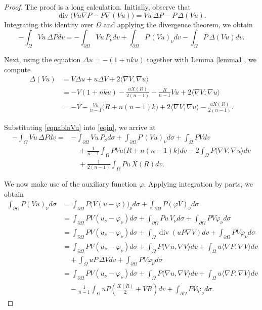 \documentclass[reqno,11pt]{amsart}
\numberwithin{equation}{section}  %
\begin{document}
\begin{proof} 
The proof is a long calculation.
Initially, observe that
\[
\operatorname{div}\bigl(Vu\nabla P-P\nabla(Vu)\bigr)
=
Vu\,\Delta P-P\,\Delta(Vu).
\]
Integrating this identity over \(\Omega\) and applying the divergence theorem, we obtain
\begin{equation}\label{eqin}
-\int_{\Omega}Vu\,\Delta Pdv
=
-\int_{\partial\Omega}Vu\,P_{\nu}dv
+\int_{\partial\Omega}P\,(Vu)_{\nu}dv
-\int_{\Omega}P\,\Delta(Vu)dv.
\end{equation}

Next, using the equation \(\Delta u=-(1+nku)\) together with Lemma \ref{lemma1}, we compute
\begin{align}\label{eqnablaVu}
\Delta(Vu)
&=
V\Delta u+u\Delta V+2\langle\nabla V,\nabla u\rangle \nonumber\\
&=
-V(1+nku)-\frac{uX(R)}{2(n-1)}-\frac{R}{n-1}Vu
+2\langle\nabla V,\nabla u\rangle \nonumber\\
&=
-V-\frac{Vu}{n-1}\bigl(R+n(n-1)k\bigr)
+2\langle\nabla V,\nabla u\rangle
-\frac{uX(R)}{2(n-1)}.
\end{align}

Substituting \eqref{eqnablaVu} into \eqref{eqin}, we arrive at
\begin{align}\label{eq43}
-\int_{\Omega}Vu\,\Delta Pdv
={}&
-\int_{\partial\Omega}Vu\,P_{\nu}d\sigma
+\int_{\partial\Omega}P\,(Vu)_{\nu}d\sigma
+\int_{\Omega}PVdv \nonumber\\
&\quad
+\frac{1}{n-1}\int_{\Omega}PVu\bigl(R+n(n-1)k\bigr)dv
-2\int_{\Omega}P\langle \nabla V,\nabla u\rangle dv\nonumber\\
&\quad
+\frac{1}{2(n-1)}\int_{\Omega}Pu\,X(R)dv.
\end{align}

We now make use of the auxiliary function \(\varphi\). Applying integration by parts, we obtain
\begin{align}\label{eq44}
\int_{\partial\Omega}P(Vu)_{\nu}d\sigma
&=
\int_{\partial\Omega}P\bigl(V(u-\varphi)\bigr)_{\nu}d\sigma
+
\int_{\partial\Omega}P(\varphi V)_{\nu}d\sigma
\nonumber\\
&=
\int_{\partial\Omega}PV(u_{\nu}-\varphi_{\nu})d\sigma
+
\int_{\partial\Omega}Pu\,V_{\nu}d\sigma
+
\int_{\partial\Omega}PV\varphi_{\nu}d\sigma
\nonumber\\
&=
\int_{\partial\Omega}PV(u_{\nu}-\varphi_{\nu})d\sigma
+
\int_{\Omega}\operatorname{div}(uP\nabla V)dv
+
\int_{\partial\Omega}PV\varphi_{\nu}d\sigma
\nonumber\\
&=
\int_{\partial\Omega}PV(u_{\nu}-\varphi_{\nu})d\sigma
+
\int_{\Omega}P\langle\nabla u,\nabla V\rangle dv
+
\int_{\Omega}u\langle\nabla P,\nabla V\rangle dv
\nonumber\\
&\quad
+
\int_{\Omega}uP\,\Delta Vdv
+
\int_{\partial\Omega}PV\varphi_{\nu}d\sigma
\nonumber\\
&=
\int_{\partial\Omega}PV(u_{\nu}-\varphi_{\nu})d\sigma
+
\int_{\Omega}P\langle\nabla u,\nabla V\rangle dv
+
\int_{\Omega}u\langle\nabla P,\nabla V\rangle dv
\nonumber\\
&\quad
-
\frac{1}{n-1}
\int_{\Omega}uP\left(\frac{X(R)}{2}+VR\right)dv
+
\int_{\partial\Omega}PV\varphi_{\nu}d\sigma.
\end{align}


\end{proof}
\end{document}
